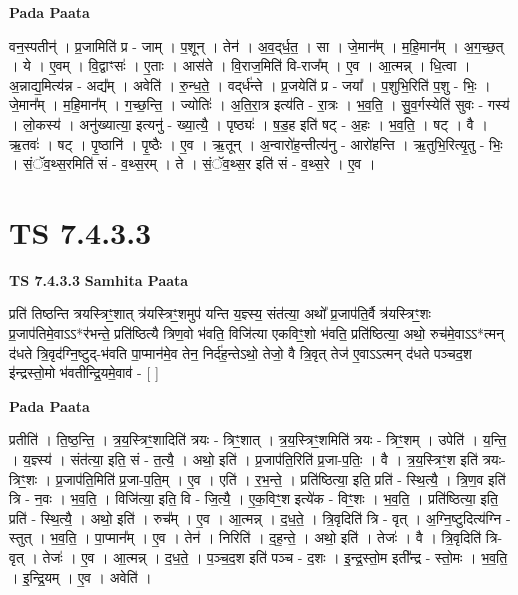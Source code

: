 \documentclass[17pt]{extarticle}
\begin{document}
\textbf{Pada Paata} \newline

वन॒स्पतीन्॑ । प्र॒जामिति॑ प्र - जाम् । प॒शून् । तेन॑ । अ॒व॒द्‌र्ध॒त॒ । सा । जे॒मान᳚म् । म॒हि॒मान᳚म् । अ॒ग॒च्छ॒त् । ये । ए॒वम् । वि॒द्वाꣳसः॑ । ए॒ताः । आस॑ते । वि॒राज॒मिति॑ वि-राज᳚म् । ए॒व । आ॒त्मन्न् । धि॒त्वा । अ॒न्नाद्य॒मित्य॑न्न - अद्य᳚म् । अवेति॑ । रु॒न्ध॒ते॒ । वद्‌र्ध॑न्ते । प्र॒जयेति॑ प्र - जया᳚ । प॒शुभि॒रिति॑ प॒शु - भिः॒ । जे॒मान᳚म् । म॒हि॒मान᳚म् । ग॒च्छ॒न्ति॒ । ज्योतिः॑ । अ॒ति॒रा॒त्र इत्य॑ति - रा॒त्रः । भ॒व॒ति॒ । सु॒व॒र्गस्येति॑ सुवः - गस्य॑ । लो॒कस्य॑ । अनु॑ख्यात्या॒ इत्यनु॑ - ख्या॒त्यै॒ । पृष्ठ्यः॑ । ष॒ड॒ह इति॑ षट् - अ॒हः । भ॒व॒ति॒ । षट् । वै । ऋ॒तवः॑ । षट् । पृ॒ष्ठानि॑ । पृ॒ष्ठैः । ए॒व । ऋ॒तून् । अ॒न्वारो॑ह॒न्तीत्य॑नु - आरो॑हन्ति । ऋ॒तुभि॒रित्यृ॒तु - भिः॒ । सं॒ॅव॒थ्स॒रमिति॑ सं - व॒थ्स॒रम् । ते । सं॒ॅव॒थ्स॒र इति॑ सं - व॒थ्स॒रे । ए॒व ।  \newline





\section{ TS 7.4.3.3 }

\textbf{TS 7.4.3.3 } \newline
\textbf{Samhita Paata} \newline

प्रति॑ तिष्ठन्ति त्रयस्त्रिꣳ॒॒शात् त्र॑यस्त्रिꣳ॒॒शमुप॑ यन्ति य॒ज्ञ्स्य॒ संत॑त्या॒ अथो᳚ प्र॒जाप॑ति॒र्वै त्र॑यस्त्रिꣳ॒॒शः प्र॒जाप॑तिमे॒वाऽऽ*र॑भन्ते॒ प्रति॑ष्ठित्यै त्रिण॒वो भ॑वति॒ विजि॑त्या एकविꣳ॒॒शो भ॑वति॒ प्रति॑ष्ठित्या॒ अथो॒ रुच॑मे॒वाऽऽ*त्मन् द॑धते त्रि॒वृद॑ग्नि॒ष्टुद्-भ॑वति पा॒प्मान॑मे॒व तेन॒ निर्द॑ह॒न्तेऽथो॒ तेजो॒ वै त्रि॒वृत् तेज॑ ए॒वाऽऽत्मन् द॑धते पञ्चद॒श इ॑न्द्रस्तो॒मो भ॑वतीन्द्रि॒यमे॒वाव॑ - [  ] \newline

\textbf{Pada Paata} \newline

प्रतीति॑ । ति॒ष्ठ॒न्ति॒ । त्र॒य॒स्त्रिꣳ॒॒शादिति॑ त्रयः - त्रिꣳ॒॒शात् । त्र॒य॒स्त्रिꣳ॒॒शमिति॑ त्रयः - त्रिꣳ॒॒शम् । उपेति॑ । य॒न्ति॒ । य॒ज्ञ्स्य॑ । संत॑त्या॒ इति॒ सं - त॒त्यै॒ । अथो॒ इति॑ । प्र॒जाप॑ति॒रिति॑ प्र॒जा-प॒तिः॒ । वै । त्र॒य॒स्त्रिꣳ॒॒श इति॑ त्रयः-त्रिꣳ॒॒शः । प्र॒जाप॑ति॒मिति॑ प्र॒जा-प॒ति॒म् । ए॒व । एति॑ । र॒भ॒न्ते॒ । प्रति॑ष्ठित्या॒ इति॒ प्रति॑ - स्थि॒त्यै॒ । त्रि॒ण॒व इति॑ त्रि - न॒वः । भ॒व॒ति॒ । विजि॑त्या॒ इति॒ वि - जि॒त्यै॒ । ए॒क॒विꣳ॒॒श इत्ये॑क - विꣳ॒॒शः । भ॒व॒ति॒ । प्रति॑ष्ठित्या॒ इति॒ प्रति॑ - स्थि॒त्यै॒ । अथो॒ इति॑ । रुच᳚म् । ए॒व । आ॒त्मन्न् । द॒ध॒ते॒ । त्रि॒वृदिति॑ त्रि - वृत् । अ॒ग्नि॒ष्टुदित्य॑ग्नि - स्तुत् । भ॒व॒ति॒ । पा॒प्मान᳚म् । ए॒व । तेन॑ । निरिति॑ । द॒ह॒न्ते॒ । अथो॒ इति॑ । तेजः॑ । वै । त्रि॒वृदिति॑ त्रि-वृत् । तेजः॑ । ए॒व । आ॒त्मन्न् । द॒ध॒ते॒ । प॒ञ्च॒द॒श इति॑ पञ्च - द॒शः । इ॒न्द्र॒स्तो॒म इती᳚न्द्र - स्तो॒मः । भ॒व॒ति॒ । इ॒न्द्रि॒यम् । ए॒व । अवेति॑ ।  \newline
\end{document}
